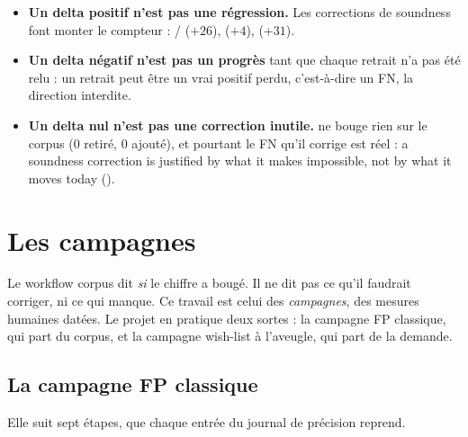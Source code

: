 \begin{piege}
\begin{itemize}
  \item \textbf{Un delta positif n'est pas une régression.} Les corrections de soundness font monter le compteur : / ($+26$),  ($+4$),  ($+31$).
  \item \textbf{Un delta négatif n'est pas un progrès} tant que chaque retrait n'a pas été relu : un retrait peut être un vrai positif perdu, c'est-à-dire un FN, la direction interdite.
  \item \textbf{Un delta nul n'est pas une correction inutile.}  ne bouge rien sur le corpus (0 retiré, 0 ajouté), et pourtant le FN qu'il corrige est réel : \og a soundness correction is justified by what it makes impossible, not by what it moves today\fg{} ().
\end{itemize}
\end{piege}

\section{Les campagnes}
\label{sec:tests-corpus-campagnes}

Le workflow corpus dit \emph{si} le chiffre a bougé. Il ne dit pas ce qu'il faudrait corriger, ni ce qui manque. Ce travail est celui des \emph{campagnes}, des mesures humaines datées. Le projet en pratique deux sortes : la campagne FP classique, qui part du corpus, et la campagne \og wish-list à l'aveugle\fg{}, qui part de la demande.

\subsection{La campagne FP classique}

Elle suit sept étapes, que chaque entrée du journal de précision reprend.

